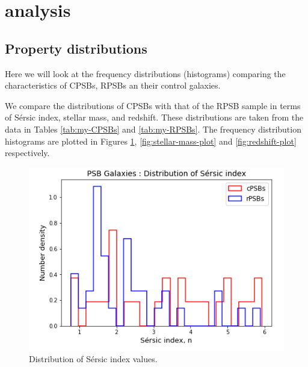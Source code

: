 \section{analysis}
\label{sec:analysis}

\subsection{Property distributions}
Here we will look at the frequency distributions (histograms) comparing the characteristics of CPSBs, RPSBs an their control galaxies.

We compare the distributions of CPSBs with that of the RPSB sample in terms of S\'ersic index, stellar mass, and redshift. These distributions are taken from the data in Tables \ref{tab:my-CPSBs} and \ref{tab:my-RPSBs}. The frequency distribution histograms are plotted in Figures \ref{fig:Sersic-plot}, \ref{fig:stellar-mass-plot} and \ref{fig:redshift-plot} respectively.

\begin{figure}
    \centering
    \includegraphics[width=\columnwidth]{images/JupyterPlots/Seric-index-distribution.png}
    \caption{Distribution of S\'ersic index values.}
    \label{fig:Sersic-plot}
\end{figure}

